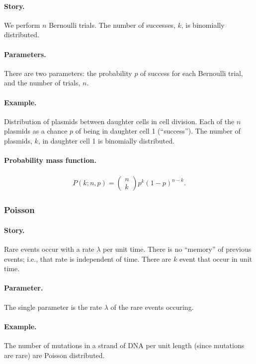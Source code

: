 \paragraph{Story.} We perform $n$ Bernoulli trials.  The number of
successes, $k$, is binomially distributed.
\paragraph{Parameters.} There are two parameters: the probability $p$
of success for each Bernoulli trial, and the number of trials, $n$.
\paragraph{Example.} Distribution of plasmids between daughter cells
in cell division.  Each of the $n$ plasmids as a chance $p$ of being
in daughter cell 1 (``success'').  The number of plasmids, $k$, in
daughter cell 1 is binomially distributed.
\paragraph{Probability mass function.}
\begin{align}
P(k;n,p) = \begin{pmatrix}
n \\
k
\end{pmatrix}
p^k (1-p)^{n-k}.
\end{align}



\subsubsection{Poisson}
\paragraph{Story.}  Rare events occur with a rate $\lambda$ per unit
time.  There is no ``memory'' of previous events; i.e., that rate is
independent of time.  There are $k$ event that occur in unit time.
\paragraph{Parameter.} The single parameter is the rate $\lambda$ of
the rare events occuring.
\paragraph{Example.} The number of mutations in a strand of DNA per
unit length (since mutations are rare) are Poisson distributed.
